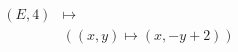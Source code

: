 \documentclass[preview]{standalone}
\begin{document}
\begin{align*}
(E,4) &\mapsto \\&( (x,y) \mapsto (x, -y + 2))
\end{align*}
\end{document}

